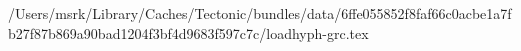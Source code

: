 /Users/msrk/Library/Caches/Tectonic/bundles/data/6ffe055852f8faf66c0acbe1a7fb27f87b869a90bad1204f3bf4d9683f597c7c/loadhyph-grc.tex